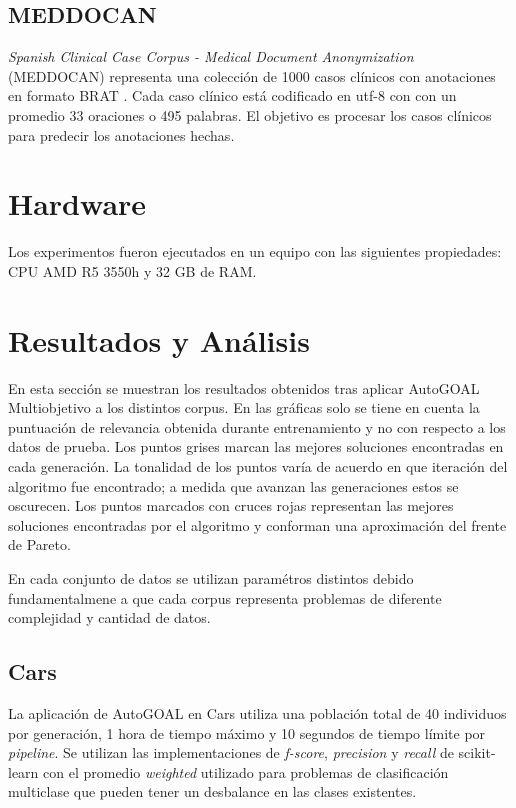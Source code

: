 \subsection{MEDDOCAN}

\textit{Spanish Clinical Case Corpus - Medical Document Anonymization} (MEDDOCAN)  representa una colecci\'on de 1000 casos cl\'inicos con anotaciones en formato BRAT . Cada caso cl\'inico est\'a codificado en utf-8 con con un promedio 33 oraciones o 495 palabras. El objetivo es procesar los casos cl\'inicos para predecir los anotaciones hechas.

\section{Hardware}
 Los experimentos fueron ejecutados en un equipo con las siguientes propiedades: CPU AMD R5 3550h y 32 GB de RAM.

\section{Resultados y An\'alisis}

En esta secci\'on se muestran los resultados obtenidos tras aplicar AutoGOAL Multiobjetivo a los distintos corpus. En las gr\'aficas solo se tiene en cuenta la puntuaci\'on de relevancia obtenida durante entrenamiento y no con respecto a los datos de prueba. Los puntos  grises marcan las mejores soluciones encontradas en cada generaci\'on.  La tonalidad de los puntos var\'ia de acuerdo en que iteraci\'on del algoritmo fue encontrado; a medida que avanzan las generaciones estos se oscurecen. Los puntos marcados con cruces rojas representan las mejores soluciones encontradas por el algoritmo y conforman una aproximaci\'on del frente de Pareto.

En cada conjunto de datos se utilizan param\'etros distintos debido fundamentalmene a que cada corpus representa problemas de diferente complejidad y cantidad de datos.

\subsection{Cars}
La aplicaci\'on de AutoGOAL en Cars utiliza una poblaci\'on total de 40 individuos por generaci\'on, 1 hora de tiempo m\'aximo y 10 segundos de tiempo l\'imite por \textit{pipeline}. Se utilizan las implementaciones de \textit{f-score}, \textit{precision} y \textit{recall} de scikit-learn  con el promedio \textit{weighted} utilizado para problemas de clasificaci\'on multiclase que pueden tener un desbalance en las clases existentes.


